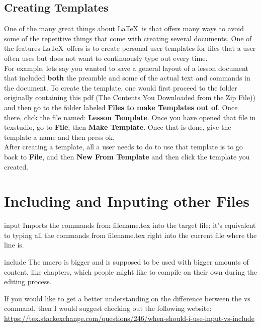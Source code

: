 \documentclass[12pt,hidelinks]{article}
\begin{document}
	\subsection{Creating Templates}
		One of the many great things about \LaTeX\ is that offers many ways to avoid some of the repetitive things that come with creating several documents. One of the features \LaTeX\ offers is to create personal user templates for files that a user often uses but does not want to continuously type out every time.\\
		For example, lets say you wanted to save a general layout of a lesson document that included \textbf{both} the preamble and some of the actual text and commands in the document. 
		To create the template, one would first proceed to the folder originally containing this pdf (The Contents You Downloaded from the Zip File)) and then go to the folder labeled \textbf{Files to make Templates out of}. Once there, click the file named: \textbf{Lesson Template}. Once you have opened that file in texstudio, go to \textbf{File}, then \textbf{Make Template}. Once that is done, give the template a name and then press ok.\\
		After creating a template, all a user needs to do to use that template is to go back to \textbf{File}, and then \textbf{New From Template} and then click the template you created.
	\vspace{-1.5mm}
\newpage
\section{Including and Inputing other Files}
\vspace{10.5cm}
	\begin{docCommand}{input}{}
		Imports the commands from filename.tex into the target file; it's equivalent to typing all the commands from filename.tex right into the current file where the  line is. 
	\end{docCommand}
	\begin{docCommand}{include}{}
		The  macro is bigger and is supposed to be used with bigger amounts of content, like chapters, which people might like to compile on their own during the editing process.
	\end{docCommand}
If you would like to get a better understanding on the difference between the  vs  command, then I would suggest checking out the following website:\\ 
\url{https://tex.stackexchange.com/questions/246/when-should-i-use-input-vs-include}\\
\newpage
\end{document}
